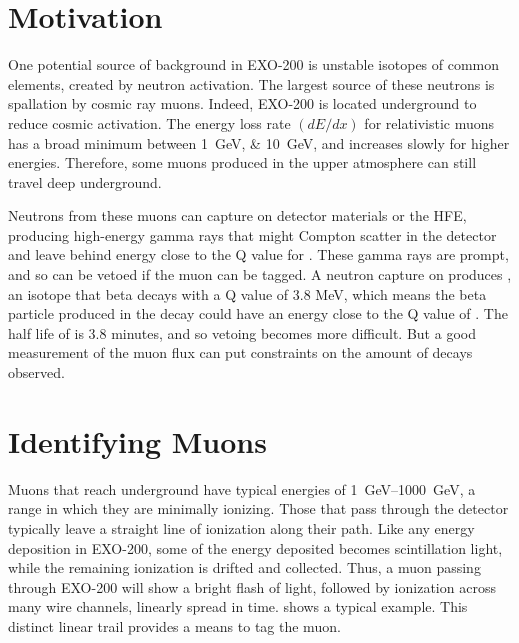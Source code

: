 \documentclass[herrin-thesis.tex]{subfiles}
\begin{document}
\section{Motivation}
\label{sec:muon:motivation}
One potential source of background in EXO-200 is unstable isotopes of common elements, created by neutron activation. The largest source of these neutrons is spallation by cosmic ray muons. Indeed, EXO-200 is located underground to reduce cosmic activation. The energy loss rate \((d E/d x)\) for relativistic muons has a broad minimum between \SIlist{1;10}{\GeV}, and increases slowly for higher energies. Therefore, some muons produced in the upper atmosphere can still travel deep underground.

Neutrons from these muons can capture on detector materials or the HFE, producing high-energy gamma rays that might Compton scatter in the detector and leave behind energy close to the Q value for . These gamma rays are prompt, and so can be vetoed if the muon can be tagged. A neutron capture on  produces , an isotope that beta decays with a Q value of 3.8 MeV, which means the beta particle produced in the decay could have an energy close to the Q value of . The half life of  is 3.8 minutes, and so vetoing becomes more difficult. But a good measurement of the muon flux can put constraints on the amount of  decays observed.

\section{Identifying Muons}
\label{sec:muon:id}
Muons that reach underground have typical energies of \SIrange{1}{1000}{\GeV}, a range in which they are minimally ionizing. Those that pass through the detector typically leave a straight line of ionization along their path. Like any energy deposition in EXO-200, some of the energy deposited becomes scintillation light, while the remaining ionization is drifted and collected. Thus, a muon passing through EXO-200 will show a bright flash of light, followed by ionization across many wire channels, linearly spread in time.  shows a typical example. This distinct linear trail provides a means to tag the muon.
\end{document}
